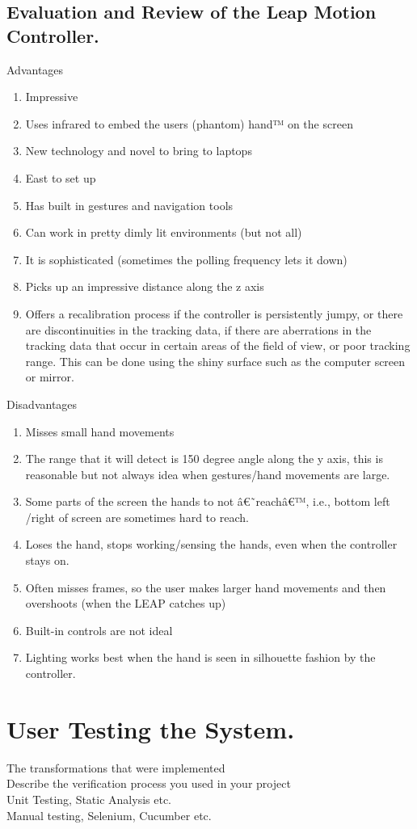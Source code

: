 \documentclass[a4paper, 11pt]{article}
\begin{document}
\subsection {Evaluation and Review of the Leap Motion Controller.}
Advantages
\begin{enumerate}
\item{Impressive}
\item{Uses infrared to embed the users (phantom) hand™ on the screen}
\item{New technology and novel to bring to laptops}
\item{East to set up}
\item{Has built in gestures and navigation tools}
\item{Can work in pretty dimly lit environments (but not all)}
\item{It is sophisticated (sometimes the polling frequency lets it down)}
\item{Picks up an impressive distance along the z axis}
\item{Offers a recalibration process if the controller is persistently jumpy, or there are discontinuities in the tracking data, if there are aberrations in the tracking data that occur in certain areas of the field of view, or poor tracking range. This can be done using the shiny surface such as the computer screen or mirror.}
\end{enumerate}	
Disadvantages
\begin{enumerate}
\item{Misses small hand movements}
\item{The range that it will detect is 150 degree angle along the y axis, this is reasonable but not always idea when gestures/hand movements are large.}
\item{Some parts of the screen the hands to not â€˜reachâ€™, i.e., bottom left /right of screen are sometimes hard to reach.}
\item{Loses the hand, stops working/sensing the hands, even when the controller stays on.}
\item{Often misses frames, so the user makes larger hand movements and then overshoots (when the LEAP catches up)}
\item{Built-in controls are not ideal}
\item{Lighting works best when the hand is seen in silhouette fashion by the controller. }
\end{enumerate}


\section{User Testing the System.}
The transformations that were implemented\\
Describe the verification process you used in your project\\
Unit Testing, Static Analysis etc.\\
Manual testing, Selenium, Cucumber etc.
\end{document}
